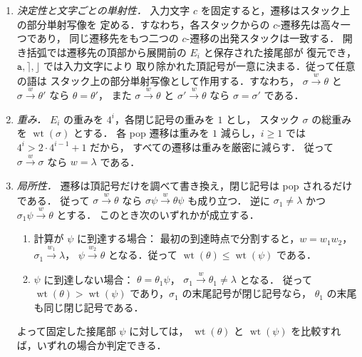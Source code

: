 \documentclass[11pt,a4paper]{ltjsarticle}
\theoremstyle{remark}
\theoremstyle{plain}
\begin{document}
\begin{enumerate}[label=\textup{(P\arabic*)},leftmargin=2.6em]
\item \emph{決定性と文字ごとの単射性．}
入力文字 $c$ を固定すると，遷移はスタック上の部分単射写像を
定める．すなわち，各スタックからの $c$-遷移先は高々一つであり，
同じ遷移先をもつ二つの $c$-遷移の出発スタックは一致する．
開き括弧では遷移先の頂部から展開前の $E_i$ と保存された接尾部が
復元でき，$\mathtt a,\rceil,\rfloor$ では入力文字により
取り除かれた頂記号が一意に決まる．従って任意の語は
スタック上の部分単射写像として作用する．すなわち，
$\sigma\xrightarrow{w}\theta$ と
$\sigma\xrightarrow{w}\theta'$ なら $\theta=\theta'$，
また $\sigma\xrightarrow{w}\theta$ と
$\sigma'\xrightarrow{w}\theta$ なら $\sigma=\sigma'$ である．

\item \emph{重み．}
$E_i$ の重みを $4^i$，各閉じ記号の重みを $1$ とし，
スタック $\sigma$ の総重みを $\operatorname{wt}(\sigma)$ とする．
各 pop 遷移は重みを $1$ 減らし，$i\ge1$ では
$4^i>2\cdot4^{i-1}+1$ だから，
すべての遷移は重みを厳密に減らす．
従って $\sigma\xrightarrow{w}\sigma$ なら $w=\lambda$ である．

\item \emph{局所性．}
遷移は頂記号だけを調べて書き換え，閉じ記号は pop されるだけである．
従って $\sigma\xrightarrow{w}\theta$ なら
$\sigma\psi\xrightarrow{w}\theta\psi$ も成り立つ．
逆に $\sigma_1\ne\lambda$ かつ
$\sigma_1\psi\xrightarrow{w}\theta$ とする．
このとき次のいずれかが成立する．
\begin{enumerate}[label=\textup{(\alph*)},nosep]
\item 計算が $\psi$ に到達する場合：
最初の到達時点で分割すると，$w=w_1w_2$，
$\sigma_1\xrightarrow{w_1}\lambda$，
$\psi\xrightarrow{w_2}\theta$ となる．従って
$\operatorname{wt}(\theta)\le\operatorname{wt}(\psi)$ である．
\item $\psi$ に到達しない場合：
$\theta=\theta_1\psi$，
$\sigma_1\xrightarrow{w}\theta_1\ne\lambda$ となる．
従って $\operatorname{wt}(\theta)>\operatorname{wt}(\psi)$
であり，$\sigma_1$ の末尾記号が閉じ記号なら，
$\theta_1$ の末尾も同じ閉じ記号である．
\end{enumerate}
よって固定した接尾部 $\psi$ に対しては，
$\operatorname{wt}(\theta)$ と $\operatorname{wt}(\psi)$
を比較すれば，いずれの場合か判定できる．
\end{enumerate}
\end{document}
